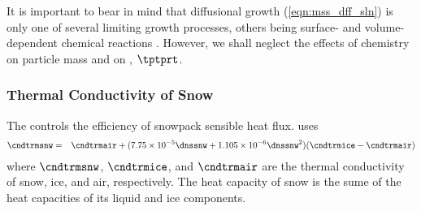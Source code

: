 \documentclass[12pt,twoside]{book}
\newcounter{reaction} %
\begin{document}
It is important to bear in mind that diffusional growth
(\ref{eqn:mss_dff_sln}) is only one of several limiting growth
processes, others being surface- and volume-dependent chemical
reactions \cite[][p.~685]{SeP97}.
However, we shall neglect the effects of chemistry on 
particle mass and on , $\tptprt$.

\subsubsection{Thermal Conductivity of Snow}\label{sxn:cnd_trm_snw}
The  controls the efficiency of 
snowpack sensible heat flux.
\citet{Jor91} uses
\begin{eqnarray}
\cndtrmsnw & = & \cndtrmair +
(7.75 \times 10^{-5} \dnssnw + 1.105 \times 10^{-6} \dnssnw^{2})
(\cndtrmice - \cndtrmair)
\label{eqn:cnd_trm_snw}
\end{eqnarray}
where $\cndtrmsnw$, $\cndtrmice$, and $\cndtrmair$ are the thermal
conductivity of snow, ice, and air, respectively.
The heat capacity of snow is the sume of the heat capacities of its
liquid and ice components.
\end{document}
